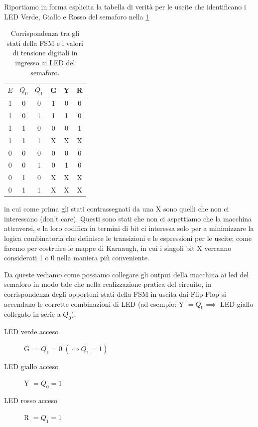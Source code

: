 \documentclass[10pt, a4paper, italian]{article}
\newcommand{\dontcare}{X}
\begin{document}
Riportiamo in forma esplicita la tabella di verità per le uscite che
identificano i LED Verde, Giallo e Rosso del semaforo nella \cref{tab: LED}
\begin{table}[htbp]
    \centering
        \begin{tabular}{c|cc|ccc}
          \toprule
          $E$ & $Q_0$ & $Q_1$ &   G   &   Y   &   R   \\
          \midrule
          \midrule
          1   &     0     &     0     &     1     &     0     &     0     \\
          1   &     0     &     1     &     1     &     1     &     0     \\
          1   &     1     &     0     &     0     &     0     &     1     \\
          1   &     1     &     1     & \dontcare & \dontcare & \dontcare \\
          \midrule
          0   &     0     &     0     &     0     &     0     &     0     \\
          0   &     0     &     1     &     0     &     1     &     0     \\
          0   &     1     &     0     & \dontcare & \dontcare & \dontcare \\
          0   &     1     &     1     & \dontcare & \dontcare & \dontcare \\
          \bottomrule   
    \end{tabular}
    \caption{Corrispondenza tra gli stati della FSM e i valori di tensione
	digitali in ingresso ai LED del semaforo. \label{tab: LED}}     
\end{table}

in cui come prima gli stati contrassegnati da una X sono quelli che non ci
interessano (don't care). Questi sono stati che non ci aspettiamo che la
macchina attraversi, e la loro codifica in termini di bit ci interessa solo
per a minimizzare la logica combinatoria che definisce le transizioni e le
espressioni per le uscite; come faremo per costruire le mappe di Karnaugh, in
cui i singoli bit X verranno considerati 1 o 0 nella maniera più conveniente.

Da queste vediamo come possiamo collegare gli output della macchina ai led del
semaforo in modo tale che nella realizzazione pratica del circuito, in
corrispondenza degli opportuni stati della FSM in uscita dai Flip-Flop si
accendano le corrette combinazioni di LED (ad esempio: Y $= Q_0 \implies$
LED giallo collegato in serie a $Q_0$).
\begin{description}
	\item[LED verde acceso] G $= Q_1 = 0 \; (\iff \overline{Q_1} = 1)$ 
    \item[LED giallo acceso] Y $= Q_0 = 1$
    \item[LED rosso acceso] R $= Q_1 = 1$
\end{description}
\end{document}
